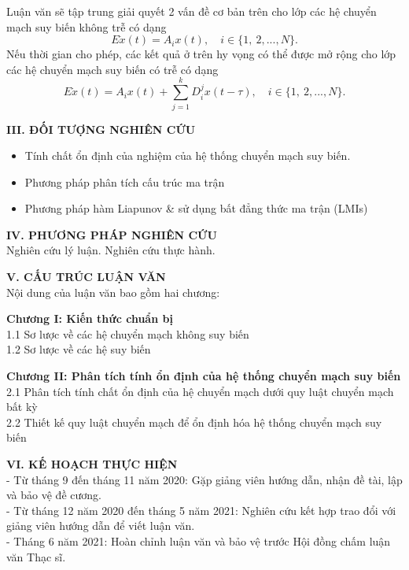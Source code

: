 \documentclass[12pt,oneside,portrait,a4paper]{book}
\theoremstyle{definition}
\theoremstyle{plain}
\begin{document}
Luận văn sẽ tập trung giải quyết 2 vấn đề cơ bản trên cho lớp các hệ chuyển mạch suy biến không trễ có dạng
%
\[
E \dot{x}(t) = A_i x(t), \quad i \in \{1,\ 2, ..., N \} .
\]
%
Nếu thời gian cho phép, các kết quả ở trên hy vọng có thể được mở rộng cho lớp các hệ chuyển mạch suy biến có trễ có dạng
%
\[
E \dot{x}(t) = A_i x(t) + \sum_{j=1}^{k}D^{j}_{i} x(t-\tau), \quad i \in \{1,\ 2, ..., N \} .
\]
%

\noindent 
\textbf{ III. ĐỐI TƯỢNG NGHIÊN CỨU}
\begin{itemize}
\item Tính chất ổn định của nghiệm của hệ thống chuyển mạch suy biến.
\item Phương pháp phân tích cấu trúc ma trận 
\item Phương pháp hàm Liapunov \& sử dụng bất đẳng thức ma trận (LMIs)
\end{itemize}

\vskip 0.5cm 
\noindent 
\textbf{ IV. PHƯƠNG PHÁP NGHIÊN CỨU}\\
\hspace*{0,5cm} Nghiên cứu lý luận. Nghiên cứu thực hành.

\vspace{6pt}
\noindent 
\textbf{ V. CẤU TRÚC LUẬN VĂN}\\
Nội dung của luận văn bao gồm hai chương:

\textbf{Chương I: Kiến thức chuẩn bị}\\
1.1 Sơ lược về các hệ chuyển mạch không suy biến \\
1.2 Sơ lược về các hệ suy biến 

\textbf{Chương II: Phân tích tính ổn định của hệ thống chuyển mạch suy biến} \\
2.1 Phân tích tính chất ổn định của hệ chuyển mạch dưới quy luật chuyển mạch bất kỳ \\
2.2 Thiết kế quy luật chuyển mạch để ổn định hóa hệ thống chuyển mạch suy biến \\

\pagebreak

\textbf{ VI. KẾ HOẠCH THỰC HIỆN}\\
\hspace*{1cm} - Từ tháng 9 đến tháng 11 năm 2020: Gặp giảng viên hướng dẫn, nhận đề tài, lập và bảo vệ đề cương.\\
\hspace*{1cm} - Từ tháng 12 năm 2020 đến tháng 5 năm 2021: Nghiên cứu kết hợp trao đổi với giảng viên hướng dẫn để viết luận văn.\\
\hspace*{1cm} - Tháng 6 năm 2021: Hoàn chỉnh luận văn và bảo vệ trước Hội đồng chấm luận văn Thạc sĩ.\\
\end{document}
